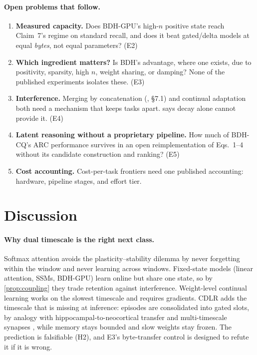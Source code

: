 \documentclass[11pt]{article}
\theoremstyle{remark}
\newcommand{\cdlr}{\textsc{CDLR}}
\begin{document}
\paragraph{Open problems that follow.}
\begin{enumerate}[leftmargin=*,itemsep=1pt]
\item \textbf{Measured capacity.} Does BDH-GPU's high-$n$ positive state reach Claim~7's regime on standard recall,
and does it beat gated/delta models at equal \emph{bytes}, not equal parameters? (E2)
\item \textbf{Which ingredient matters?} Is BDH's advantage, where one exists, due to positivity, sparsity, high
$n$, weight sharing, or damping? None of the published experiments isolates these. (E3)
\item \textbf{Interference.} Merging by concatenation (\citealp{kosowski2025bdh}, \S7.1) and continual adaptation
both need a mechanism that keeps tasks apart.  says decay alone cannot provide it. (E4)
\item \textbf{Latent reasoning without a proprietary pipeline.} How much of BDH-CQ's ARC performance survives in
an open reimplementation of Eqs.~1--4 without its candidate construction and ranking? (E5)
\item \textbf{Cost accounting.} Cost-per-task frontiers need one published accounting: hardware, pipeline stages,
and effort tier.
\end{enumerate}

\section{Discussion}
\label{sec:discussion}

\paragraph{Why dual timescale is the right next class.} Softmax attention avoids the plasticity--stability
dilemma by never forgetting within the window and never learning across windows. Fixed-state models (linear
attention, SSMs, BDH-GPU) learn online but share one state, so by \cref{prop:coupling} they trade retention against
interference. Weight-level continual learning \citep{kirkpatrick2017ewc,zenke2017si} works on the slowest
timescale and requires gradients. \cdlr{} adds the timescale that is missing at inference: episodes are
consolidated into gated slots, by analogy with hippocampal-to-neocortical transfer \citep{mcclelland1995cls} and
multi-timescale synapses \citep{benna2016consolidation}, while memory stays bounded and slow weights stay frozen.
The prediction is falsifiable (H2), and E3's byte-transfer control is designed to refute it if it is wrong.
\end{document}
